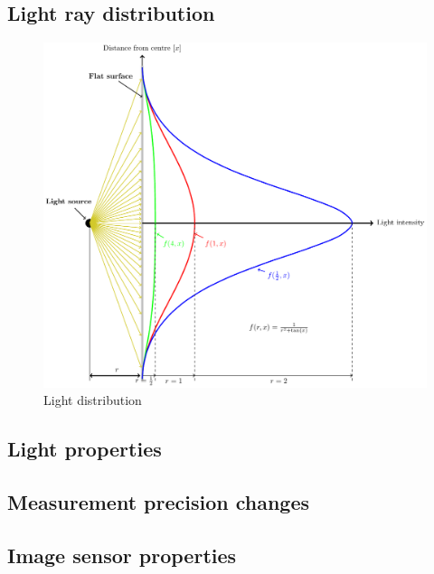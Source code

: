 \subsection{Light ray distribution}
\begin{figure}[ht]
	\centering
	\includegraphics[width=1\textwidth]{2-theory/backlight/lightsource.pdf}
	\caption{Light distribution\label{theory:lightdistribution}}
\end{figure} 
\subsection{Light properties}
\subsection{Measurement precision changes}
\subsection{Image sensor properties}

